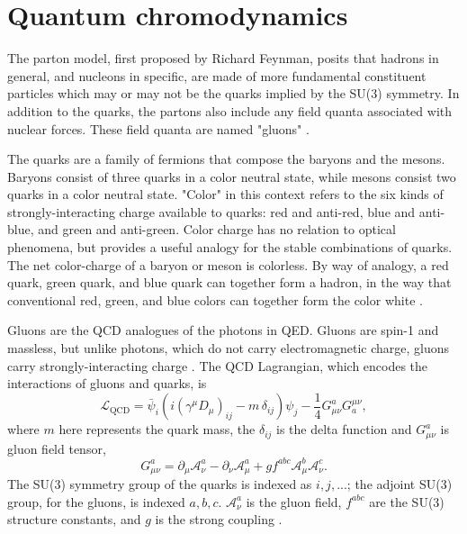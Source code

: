 \section{Quantum chromodynamics}

The parton model, first proposed by Richard Feynman, posits that hadrons in general, and nucleons in specific, are made of more fundamental constituent particles which may or may not be the quarks implied by the SU(3) symmetry. In addition to the quarks, the partons also include any field quanta associated with nuclear forces. These field quanta are named "gluons" \cite{GellMann:1964nj}.

The quarks are a family of fermions that compose the baryons and the mesons. Baryons consist of three quarks in a color neutral state, while mesons consist two quarks in a color neutral state. "Color" in this context refers to the six kinds of strongly-interacting charge available to quarks: red and anti-red, blue and anti-blue, and green and anti-green. Color charge has no relation to optical phenomena, but provides a useful analogy for the stable combinations of quarks. The net color-charge of a baryon or meson is colorless. By way of analogy, a red quark, green quark, and blue quark can together form a hadron, in the way that conventional red, green, and blue colors can together form the color white \cite{Brock:1993sz}. 

Gluons are the QCD analogues of the photons in QED. Gluons are spin-1 and massless, but unlike photons, which do not carry electromagnetic charge, gluons carry strongly-interacting charge \cite{Wilczek:2000ih}. The QCD Lagrangian, which encodes the interactions of gluons and quarks, is
\begin{equation}
{\mathcal {L}}_{\mathrm {QCD} }={\bar {\psi }}_{i}\left(i(\gamma ^{\mu }D_{\mu })_{ij}-m\,\delta _{ij}\right)\psi _{j}-{\frac {1}{4}}G_{\mu \nu }^{a}G_{a}^{\mu \nu },
\end{equation}
where $m$ here represents the quark mass, the $\delta_{ij}$ is the delta function and $G_{\mu \nu }^{a}$ is gluon field tensor,  
\begin{equation}
\displaystyle G_{\mu \nu }^{a}=\partial _{\mu }{\mathcal {A}}_{\nu }^{a}-\partial _{\nu }{\mathcal {A}}_{\mu }^{a}+gf^{abc}{\mathcal {A}}_{\mu }^{b}{\mathcal {A}}_{\nu }^{c}.
\end{equation}
The SU(3) symmetry group of the quarks is indexed as $i,j,...$; the adjoint SU(3) group, for the gluons, is indexed $a,b,c$. ${\mathcal {A}}_{\nu }^{a}$ is the gluon field, $f^{abc}$ are the SU(3) structure constants, and $g$ is the strong coupling \cite{Schafer:2005ff}. 

